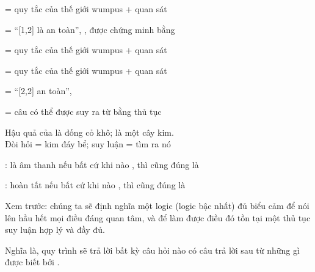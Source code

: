 \documentclass{article}
\begin{document}
\begin{huge}

\textwidth
{}

 = quy tắc của thế giới wumpus + quan sát

 = ``[1,2] là an toàn'', , được chứng minh bằng 



\textwidth
{}

 = quy tắc của thế giới wumpus + quan sát


\textwidth
{}

 = quy tắc của thế giới wumpus + quan sát

 = ``[2,2] an toàn'', 




 = câu \mat{$\alpha$} có thể được suy ra từ  bằng thủ tục 

Hậu quả của  là đống cỏ khô; \mat{$\alpha$} là một cây kim.\\
Đòi hỏi = kim đáy bể; suy luận = tìm ra nó

:  là âm thanh nếu\nl
bất cứ khi nào , thì cũng đúng là 

:  hoàn tất nếu\nl
bất cứ khi nào , thì cũng đúng là 

Xem trước: chúng ta sẽ định nghĩa một logic (logic bậc nhất)
đủ biểu cảm để nói lên hầu hết mọi điều đáng quan tâm, và để làm được điều đó
tồn tại một thủ tục suy luận hợp lý và đầy đủ.

Nghĩa là, quy trình sẽ trả lời bất kỳ câu hỏi nào có câu trả lời sau
từ những gì được biết bởi .





\end{huge}
\end{document}
